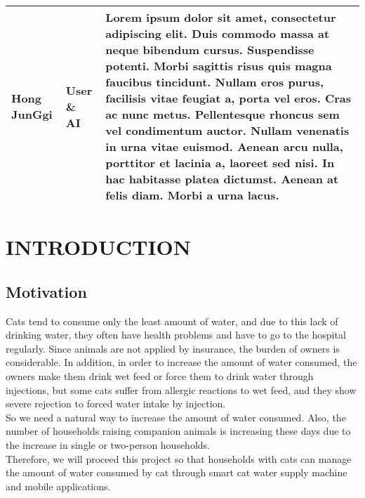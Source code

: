 \documentclass[conference]{IEEEtran}
\begin{document}
\newpage
\begin{table}[htbp!]\normalsize
\begin{center}
\begin{tabular}{|p{1.2cm}|p{1.9cm}|p{4.5cm}|}
\hline
Hong JunGgi & User \newline \& AI &
Lorem ipsum dolor sit amet, consectetur adipiscing elit. Duis commodo massa at neque bibendum cursus. Suspendisse potenti. Morbi sagittis risus quis magna faucibus tincidunt. Nullam eros purus, facilisis vitae feugiat a, porta vel eros. Cras ac nunc metus. Pellentesque rhoncus sem vel condimentum auctor. Nullam venenatis in urna vitae euismod. Aenean arcu nulla, porttitor et lacinia a, laoreet sed nisi. In hac habitasse platea dictumst. Aenean at felis diam. Morbi a urna lacus.
\\ \hline
\end{tabular}
\label{tab3}
\end{center}
\end{table}

\section{INTRODUCTION}
\subsection{Motivation}
Cats tend to consume only the least amount of water, and due to this lack of drinking water, they often have health problems and have to go to the hospital regularly. Since animals are not applied by insurance, the burden of owners is considerable. In addition, in order to increase the amount of water consumed, the owners make them drink wet feed or force them to drink water through injections, but some cats suffer from allergic reactions to wet feed, and they show severe rejection to forced water intake by injection. \\
So we need a natural way to increase the amount of water consumed. Also, the number of households raising companion animals is increasing these days due to the increase in single or two-person households. \\

Therefore, we will proceed this project so that households with cats can manage the amount of water consumed by cat through smart cat water supply machine and mobile applications. \\
\end{document}
